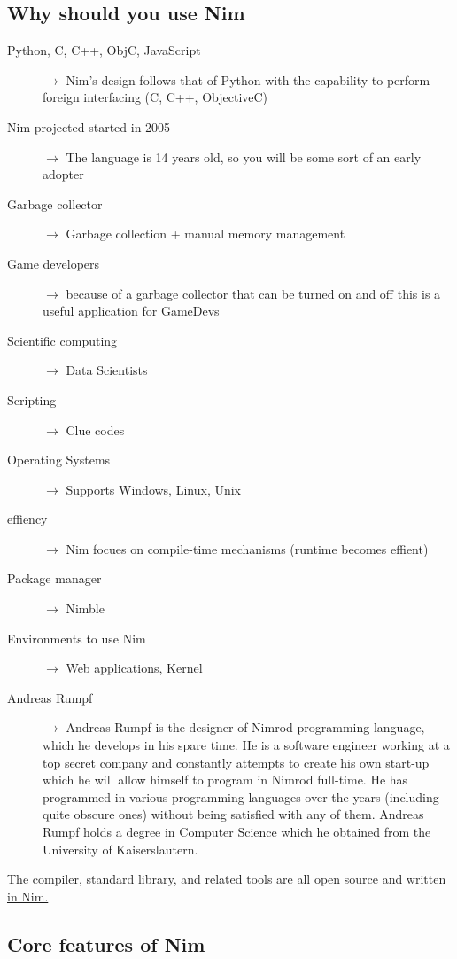 \documentclass[10pt, a4paper, twocolumn]{article} %
\begin{document}
\newpage
\subsection{Why should you use Nim}
\begin{description}
	\item[Python, C, C++, ObjC, JavaScript] $\longrightarrow$ Nim's design follows that of Python with the capability to perform foreign interfacing (C, C++, ObjectiveC)
	\item[Nim projected started in 2005] $\longrightarrow$  The language is 14 years old, so you will be some sort of an early adopter
	\item[Garbage collector] $\longrightarrow$  Garbage collection + manual memory management
	\item[Game developers] $\longrightarrow$  because of a garbage collector that can be turned on and off this is a useful application for GameDevs
	\item[Scientific computing] $\longrightarrow$  Data Scientists
	\item[Scripting] $\longrightarrow$  Clue codes
	\item[Operating Systems] $\longrightarrow$  Supports Windows, Linux, Unix
	\item[effiency] $\longrightarrow$  Nim focues on compile-time mechanisms (runtime becomes effient)
	\item[Package manager] $\longrightarrow$   Nimble
	\item[Environments to use Nim] $\longrightarrow$  Web applications, Kernel
	\item[Andreas Rumpf] $\longrightarrow$  Andreas Rumpf is the designer of Nimrod programming language, which he develops in his spare time. He is a software engineer working at a top secret company and constantly attempts to create his own start-up which he will allow himself to program in Nimrod full-time. He has programmed in various programming languages over the years (including quite obscure ones) without being satisfied with any of them. Andreas Rumpf holds a degree in Computer Science which he obtained from the University of Kaiserslautern.
\end{description}

\href{https://github.com/nim-lang/Nim#contributing}{The compiler, standard library, and related tools are all open source and written in Nim.}

\subsection{Core features of Nim}
\end{document}
